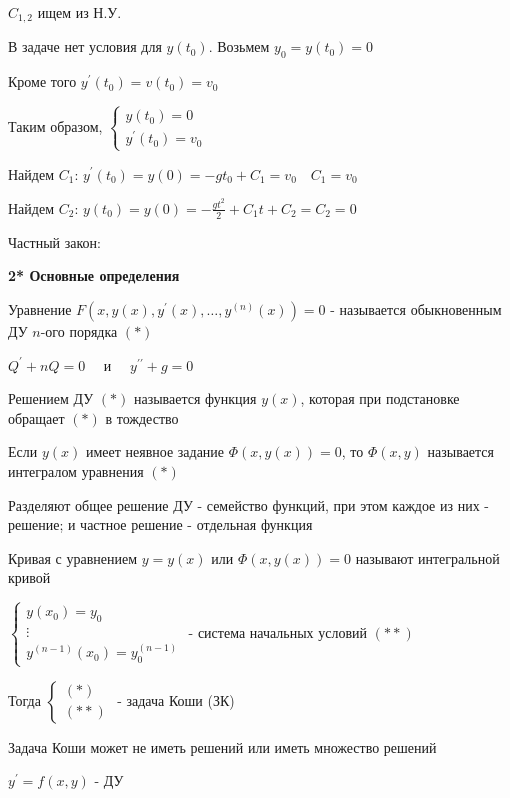 \documentclass[12pt]{article}
\begin{document}
    $C_{1,2}$ ищем из Н.У.

    В задаче нет условия для $y(t_0)$. Возьмем $y_0 = y(t_0) = 0$

    Кроме того $y^\prime(t_0) = v(t_0) = v_0$

    Таким образом, $\begin{cases}y(t_0) = 0 \\ y^\prime(t_0) = v_0\end{cases}$

    Найдем $C_1$: $y^\prime(t_0) = y(0) = -gt_0 + C_1 = v_0 \quad C_1 = v_0$

    Найдем $C_2$: $y(t_0) = y(0) = -\frac{gt^2}{2} + C_1 t + C_2 = C_2 = 0$

    Частный закон: 

    \vspace{5mm}

    \textbf{2* Основные определения}

     Уравнение $F(x, y(x), y^\prime(x), \dots, y^{(n)}(x)) = 0$ - называется обыкновенным ДУ $n$-ого порядка $(*)$

    \Ex $Q^\prime + nQ = 0 \quad$ и $\quad y^{\prime\prime} + g = 0$

     Решением ДУ $(*)$ называется функция $y(x)$, которая при подстановке обращает $(*)$ в тождество

     Если $y(x)$ имеет неявное задание $\Phi(x, y(x)) = 0$, то $\Phi(x, y)$ называется интегралом уравнения $(*)$

    \Nota Разделяют общее решение ДУ - семейство функций, при этом каждое из них - решение; и
    частное решение - отдельная функция

     Кривая с уравнением $y = y(x)$ или $\Phi(x, y(x)) = 0$ называют интегральной кривой

     $\begin{cases}y(x_0) = y_0 \\ \vdots \\ y^{(n - 1)}(x_0) = y_0^{(n - 1)}\end{cases}$ - система начальных условий $(**)$

    Тогда $\begin{cases}(*) \\ (**)\end{cases}$ - задача Коши (ЗК)

    \Nota Задача Коши может не иметь решений или иметь множество решений

    \Th $y^\prime = f(x, y)$ - ДУ
\end{document}
